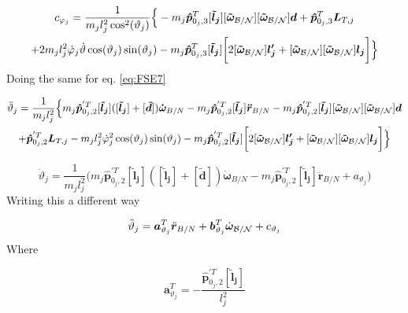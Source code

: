 \begin{multline}
	c_{\varphi_j} = \frac{1}{m_j l_j^2 \cos^2(\vartheta_j)}\Big\{-m_{j} \bm{\hat{p}}_{0_j,3}^{T} [\bm{\tilde{l}_j}][\bm{\tilde{\omega}}_{\cal B/N}][\bm{\tilde{\omega}}_{\cal B/N}] \bm{d}+\bm{\hat{p}}_{0_j,3}^T \bm{L}_{T,j}\\+2m_j l_j^2\dot{\varphi}_j\dot{\vartheta}\cos(\vartheta_j)\sin(\vartheta_j)- m_j \bm{\hat{p}}_{0_j,3}^T [\bm{\tilde{l}_j}]\bigg[2[\bm{\tilde{\omega}}_{\cal B/N}] \bm{l_j'}+[\bm{\tilde{\omega}}_{\cal B/N}][\bm{\tilde{\omega}}_{\cal B/N}] \bm{l_j}\bigg]\Big\}
	\label{eq:BSM6}
\end{multline}	
Doing the same for eq. \eqref{eq:FSE7}

\begin{multline}
	\ddot{\vartheta}_j 
	=\frac{1}{m_j l_j^2}\Big\{m_{j}\bm{\hat{p}}_{0_j,2}^{'T} [\bm{\tilde{l}_j}]( [\bm{\tilde{l}_j}] + [\bm{\tilde{d}}])\bm{\dot{\omega}}_{B/N}
	-m_{j} \bm{\hat{p}}_{0_j,2}^{'T} [\bm{\tilde{l}_j}] \bm{\ddot{r}}_{B/N}-m_{j} \bm{\hat{p}}_{0_j,2}^{'T}[\bm{\tilde{l}_j}][\bm{\tilde{\omega}}_{\cal B/N}][\bm{\tilde{\omega}}_{\cal B/N}] \bm{d}\\+\bm{\hat{p}}_{0_j,2}^{'T} \bm{L}_{T,j}-m_j l_j^2\dot{\varphi}_j^2\cos(\vartheta_j)\sin(\vartheta_j)- m_j \bm{\hat{p}}_{0_j,2}^{'T} [\bm{\tilde{l}_j}]\bigg[2[\bm{\tilde{\omega}}_{\cal B/N}] \bm{l_j'}+[\bm{\tilde{\omega}}_{\cal B/N}][\bm{\tilde{\omega}}_{\cal B/N}] \bm{l_j}\bigg]\Big\}
	\label{eq:BSM7}
\end{multline}

\begin{equation}
	\ddot \vartheta_j =\frac{1}{m_j l_j^2} \Big(m_{j}\bm{\hat{p}}_{0_j,2}^{'T} [\bm{\tilde{l}_j}]([\bm{\tilde{l}_j}] + [\bm{\tilde{d}}])\bm{\dot{\omega}}_{B/N}
	-m_{j} \bm{\hat{p}}_{0_j,2}^{'T} [\bm{\tilde{l}_j}] \bm{\ddot{r}}_{B/N} + a_{\vartheta_j} \Big)
	\label{eq:BSM8}
\end{equation}
Writing this a different way

\begin{equation}
	\ddot \vartheta_j = \bm a_{\vartheta_j}^T \ddot{\bm r}_{B/N} + \bm b_{\vartheta_j}^T \dot{\bm\omega}_{\cal B/N} + c_{\vartheta_j}
	\label{eq:BSM9}
\end{equation}
Where

\begin{equation}
	\bm a_{\vartheta_j}^{T} = - \frac{ \bm{\hat{p}}_{0_j,2}^{'T} [\bm{\tilde{l}_j}]}{ l_j^2}
	\label{eq:BSM10}
\end{equation}


